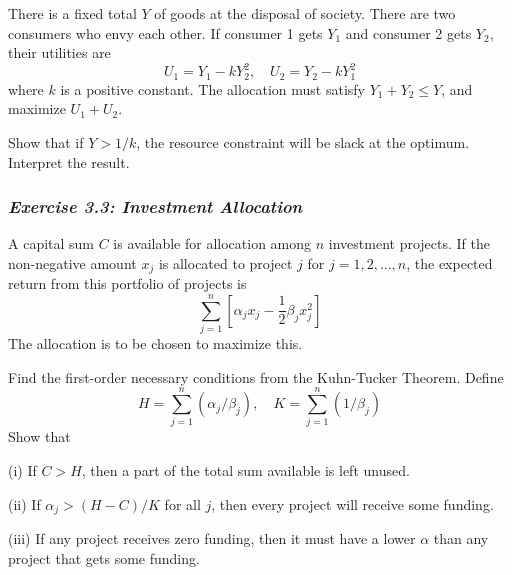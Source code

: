 There is a fixed total $Y$ of goods at the disposal of society. There are two consumers who envy each other. If consumer 1 gets $Y_1$ and consumer 2 gets $Y_2$, their utilities are
\begin{equation*}
U_1 = Y_1 - k Y_2^2,  \quad   U_2 = Y_2 -k Y_1^2
\end{equation*}
where $k$ is a positive constant. The allocation must satisfy $Y_1 + Y_2 \leq Y$, and maximize $U_1 + U_2$.

Show that if $Y > 1/k$, the resource constraint will be slack at the optimum. Interpret the result.

\subsubsection*{\textit{Exercise 3.3: Investment Allocation}}

A capital sum $C$ is available for allocation among $n$ investment projects. If the non-negative amount $x_j$ is allocated to project $j$ for $j=1,2,\dots,n$, the expected return from this portfolio of projects is
\begin{equation*}
\sum_{j=1}^n [ \alpha_j x_j - \dfrac{1}{2} \beta_j x_j^2 ]
\end{equation*}
The allocation is to be chosen to maximize this.

Find the first-order necessary conditions from the Kuhn-Tucker Theorem. Define
\begin{equation*}
 H= \sum_{j=1}^n (\alpha_j/ \beta_j), \quad K=\sum_{j=1}^n (1/\beta_j)
\end{equation*}
Show that

(i) If $C>H$, then a part of the total sum available is left unused.

(ii) If $\alpha_j > (H-C)/K$ for all $j$, then every project will receive some funding.

(iii) If any project receives zero funding, then it must have a lower $\alpha$ than any project that gets some funding.


